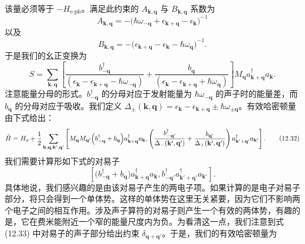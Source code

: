 该量必须等于 $-H_{\mathrm{e}\text{-}\mathrm{ph}}$。满足此约束的 $A_{\mathbf{k},\mathbf{q}}$ 与 $B_{\mathbf{k},\mathbf{q}}$ 系数为
\begin{equation*}
A_{\mathbf{k},\mathbf{q}}=-\bigl(\hbar\omega_{-\mathbf{q}}+\epsilon_{\mathbf{k}+\mathbf{q}}-\epsilon_{\mathbf{k}}\bigr)^{-1}\tag{12.29}
\end{equation*}
以及
\begin{equation*}
B_{\mathbf{k},\mathbf{q}}=-\bigl(\epsilon_{\mathbf{k}+\mathbf{q}}-\epsilon_{\mathbf{k}}-\hbar\omega_{\mathbf{q}}\bigr)^{-1}.\tag{12.30}
\end{equation*}
于是我们的幺正变换为
\begin{equation*}
S=\sum_{\mathbf{k},\mathbf{q}}\left[\frac{b_{-\mathbf{q}}^{\dagger}}{\left(\epsilon_{\mathbf{k}}-\epsilon_{\mathbf{k}+\mathbf{q}}-\hbar\omega_{-\mathbf{q}}\right)}+\frac{b_{\mathbf{q}}}{\left(\epsilon_{\mathbf{k}}-\epsilon_{\mathbf{k}+\mathbf{q}}+\hbar\omega_{\mathbf{q}}\right)}\right]M_{\mathbf{q}}a_{\mathbf{k}+\mathbf{q}}^{\dagger}a_{\mathbf{k}}.\tag{12.31}
\end{equation*}
注意能量分母的形式。$b_{-\mathbf{q}}^{\dagger}$ 的分母对应于发射能量为 $\hbar\omega_{-\mathbf{q}}$ 的声子时的能量差，而 $b_{\mathbf{q}}$ 的分母对应于吸收。我们定义 $\Delta_{\pm}(\mathbf{k},\mathbf{q})=\epsilon_{\mathbf{k}}-\epsilon_{\mathbf{k}+\mathbf{q}}\pm\hbar\omega_{\pm\mathbf{q}}$。有效哈密顿量由下式给出：
\begin{equation*}
\tilde{H}=H_{o}+\frac{1}{2}\sum_{\mathbf{k},\mathbf{q},\mathbf{k}',\mathbf{q}'}\left[M_{\mathbf{q}}M_{\mathbf{q}'}\Bigl(b_{-\mathbf{q}}^{\dagger}+b_{\mathbf{q}}\Bigr)a_{\mathbf{k}+\mathbf{q}}^{\dagger}a_{\mathbf{k}},\left(\frac{b_{-\mathbf{q}'}^{\dagger}}{\Delta_{-}(\mathbf{k}',\mathbf{q}')}+\frac{b_{\mathbf{q}'}}{\Delta_{+}(\mathbf{k}',\mathbf{q}')}\right)a_{\mathbf{k}'+\mathbf{q}'}^{\dagger}a_{\mathbf{k}'}\right].\tag{12.32}
\end{equation*}
我们需要计算形如下式的对易子
\begin{equation*}
\left[\bigl(b_{-\mathbf{q}}^{\dagger}+b_{\mathbf{q}}\bigr)a_{\mathbf{k}+\mathbf{q}}^{\dagger}a_{\mathbf{k}},b_{-\mathbf{q}'}^{\dagger}a_{\mathbf{k}'+\mathbf{q}'}^{\dagger}a_{\mathbf{k}'}\right].\tag{12.33}
\end{equation*}
具体地说，我们感兴趣的是由该对易子产生的两电子项。如果计算的是电子对易子部分，将只会得到一个单体势。这样的单体势在这里无关紧要，因为它们不影响两个电子之间的相互作用。涉及声子算符的对易子则产生一个有效的两体势，有趣的是，它在费米能附近一个窄的能量尺度内为负。为看清这一点，我们注意到式 (12.33) 中对易子的声子部分给出约束 $\delta_{\mathbf{q}+\mathbf{q}'}$。于是，我们的有效哈密顿量为
